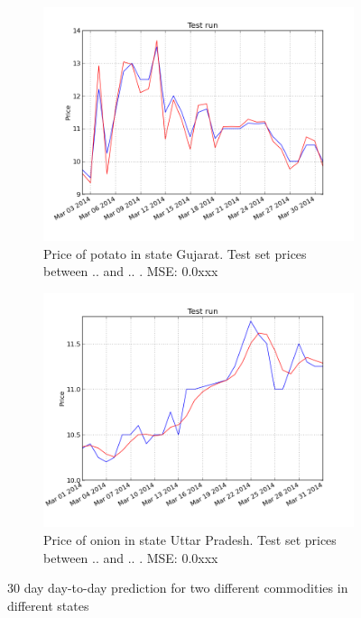\begin{figure}[!ht]
    \centering
        \begin{subfigure}[b]{.45\textwidth}
        \centering
        \includegraphics[width=\textwidth]{./img/plots/esn/daily/gujarat_potato_online_30d_1d.png}
        \caption{Price of potato in state Gujarat. Test set prices between .. and .. . MSE: 0.0xxx}
        \label{subfig:res_30d_1}
        \end{subfigure}
        \quad
        \begin{subfigure}[b]{.45\textwidth}
        \centering
        \includegraphics[width=\textwidth]{./img/plots/esn/daily/uttar_pradesh_redonion_30d_1d.png}
        \caption{Price of onion in state Uttar Pradesh. Test set prices between .. and .. . MSE: 0.0xxx}
        \label{subfig:res_30d_2}
        \end{subfigure}
    \caption{30 day day-to-day prediction for two different commodities in different states}   
    \label{fig:res_30d}
\end{figure}

